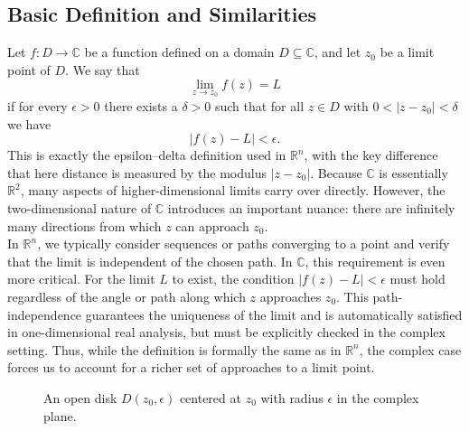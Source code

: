 \subsection*{Basic Definition and Similarities}

\noindent Let \(f: D \to \mathbb{C}\) be a function defined on a domain \(D \subseteq \mathbb{C}\), and let \(z_0\) be a limit point of \(D\). We say that 
\[
\lim_{z \to z_0} f(z) = L
\]
if for every \(\epsilon > 0\) there exists a \(\delta > 0\) such that for all \(z \in D\) with \(0 < |z - z_0| < \delta\) we have
\[
|f(z) - L| < \epsilon.
\]
This is exactly the epsilon–delta definition used in \(\mathbb{R}^n\), with the key difference that here distance is measured by the modulus \(|z-z_0|\). Because \(\mathbb{C}\) is essentially \(\mathbb{R}^2\), many aspects of higher-dimensional limits carry over directly. However, the two-dimensional nature of \(\mathbb{C}\) introduces an important nuance: there are infinitely many directions from which \(z\) can approach \(z_0\). \\

\noindent In \(\mathbb{R}^n\), we typically consider sequences or paths converging to a point and verify that the limit is independent of the chosen path. In \(\mathbb{C}\), this requirement is even more critical. For the limit \(L\) to exist, the condition \(|f(z) - L| < \epsilon\) must hold regardless of the angle or path along which \(z\) approaches \(z_0\). This path-independence guarantees the uniqueness of the limit and is automatically satisfied in one-dimensional real analysis, but must be explicitly checked in the complex setting. Thus, while the definition is formally the same as in \(\mathbb{R}^n\), the complex case forces us to account for a richer set of approaches to a limit point.



\begin{figure}[H]
\centering
{}
\caption{An open disk \(D(z_0, \epsilon)\) centered at \(z_0\) with radius \(\epsilon\) in the complex plane.}
\label{fig:open-disk}
\end{figure}


